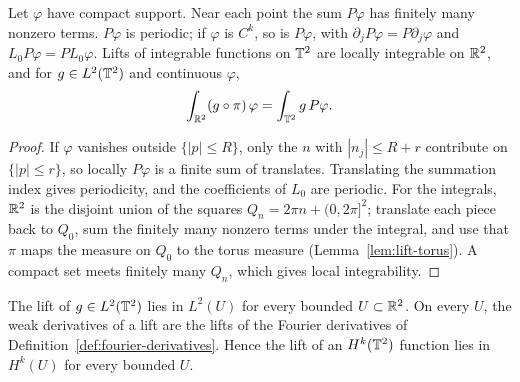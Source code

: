 \begin{lemma}
\label{lem:lift-periodization}
\leanok
Let $\varphi$ have compact support. Near each point the sum $P\varphi$ has finitely many
nonzero terms. $P\varphi$ is periodic; if $\varphi$ is $C^k$, so is $P\varphi$, with
$\partial_jP\varphi=P\partial_j\varphi$ and $L_0P\varphi=PL_0\varphi$. Lifts of integrable
functions on $\mathbb{T}^2$ are locally integrable on $\mathbb{R}^2$, and for $g\in L^2(\mathbb{T}^2)$ and continuous
$\varphi$,
\[
 \int_{\mathbb{R}^2}(g\circ\pi)\,\varphi=\int_{\mathbb{T}^2}g\,P\varphi.
\]
\end{lemma}

\begin{proof}
\leanok
If $\varphi$ vanishes outside $\{|p|\le R\}$, only the $n$ with $|n_j|\le R+r$ contribute
on $\{|p|\le r\}$, so locally $P\varphi$ is a finite sum of translates. Translating the
summation index gives periodicity, and the coefficients of $L_0$ are periodic. For the
integrals, $\mathbb{R}^2$ is the disjoint union of the squares $Q_n=2\pi n+(0,2\pi]^2$; translate
each piece back to $Q_0$, sum the finitely many nonzero terms under the integral, and use
that $\pi$ maps the measure on $Q_0$ to the torus measure (Lemma~\ref{lem:lift-torus}).
A compact set meets finitely many $Q_n$, which gives local integrability.
\end{proof}

\begin{lemma}
\label{lem:lift-sobolev-local}
\leanok
The lift of $g\in L^2(\mathbb{T}^2)$ lies in $L^2(U)$ for every bounded $U\subset\mathbb{R}^2$. On every
$U$, the weak derivatives of a lift are the lifts of the Fourier derivatives of
Definition~\ref{def:fourier-derivatives}. Hence the lift of an $H^k(\mathbb{T}^2)$ function lies in
$H^k(U)$ for every bounded $U$.
\end{lemma}


